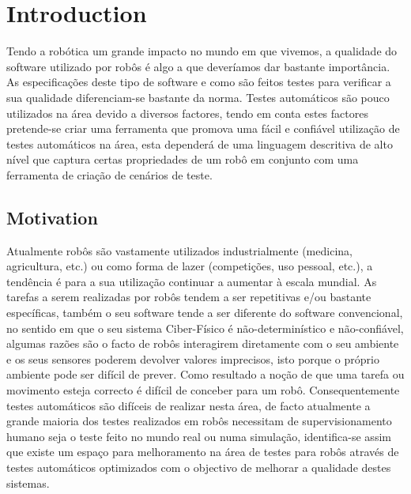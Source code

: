 \chapter{Introduction}
\label{chap:introduction}

Tendo a robótica um grande impacto no mundo em que vivemos, a qualidade do software utilizado por 
robôs é algo a que deveríamos dar bastante importância. As especificações deste tipo de software e 
como são feitos testes para verificar a sua qualidade diferenciam-se bastante da norma. Testes 
automáticos são pouco utilizados na área devido a diversos factores, tendo em conta estes factores 
pretende-se criar uma ferramenta que promova uma fácil e confiável utilização de testes automáticos 
na área, esta dependerá de uma linguagem descritiva de alto nível que captura certas propriedades de 
um robô em conjunto com uma ferramenta de criação de cenários de teste.

\section{Motivation}
\label{sec:motivation}
Atualmente robôs são vastamente utilizados industrialmente (medicina, agricultura, etc.) ou como 
forma de lazer (competições, uso pessoal, etc.), a tendência é para a sua utilização continuar a 
aumentar à escala mundial. As tarefas a serem realizadas por robôs tendem a ser repetitivas e/ou 
bastante específicas, também o seu software tende a ser diferente do software convencional, no 
sentido em que o seu sistema Ciber-Físico é não-determinístico e não-confiável, algumas razões são o 
facto de robôs interagirem diretamente com o seu ambiente e os seus sensores poderem devolver valores 
imprecisos, isto porque o próprio ambiente pode ser difícil de prever. Como resultado a noção de que 
uma tarefa ou movimento esteja correcto é difícil de conceber para um robô. Consequentemente testes 
automáticos são difíceis de realizar nesta área, de facto atualmente a grande maioria dos testes 
realizados em robôs necessitam de supervisionamento humano seja o teste feito no mundo real ou numa 
simulação, identifica-se assim que existe um espaço para melhoramento na área de testes para robôs 
através de testes automáticos optimizados com o objectivo de melhorar a qualidade destes sistemas.

